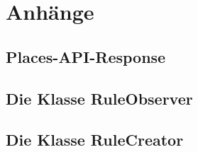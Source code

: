 \section{Anh\"ange}
\subsection{Places-API-Response}
\label{Places_API-Response Anhang}

\cite{PlacesAPIGoogle}

\subsection{Die Klasse RuleObserver}
\label{Die Klasse RuleObserver}


\subsection{Die Klasse RuleCreator}
\label{Die Klasse RuleCreator}
